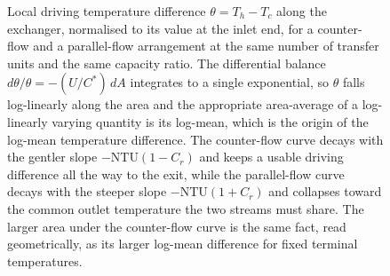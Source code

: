 \begin{figure}[htbp]
\centering
{}
\caption[Driving difference decaying along the exchanger]{Local driving
temperature difference $\theta = T_h - T_c$ along the exchanger, normalised to its
value at the inlet end, for a counter-flow and a parallel-flow arrangement at the
same number of transfer units and the same capacity ratio. The differential
balance $d\theta/\theta = -(U/C^\ast)\,dA$ integrates to a single exponential, so
$\theta$ falls log-linearly along the area and the appropriate area-average of a
log-linearly varying quantity is its log-mean, which is the origin of the log-mean
temperature difference. The counter-flow curve decays with the gentler slope
$-\mathrm{NTU}(1-C_r)$ and keeps a usable driving difference all the way to the
exit, while the parallel-flow curve decays with the steeper slope
$-\mathrm{NTU}(1+C_r)$ and collapses toward the common outlet temperature the two
streams must share. The larger area under the counter-flow curve is the same fact,
read geometrically, as its larger log-mean difference for fixed terminal
temperatures.}
\label{fig:vol04ch06:deltat-decay}
\end{figure}
